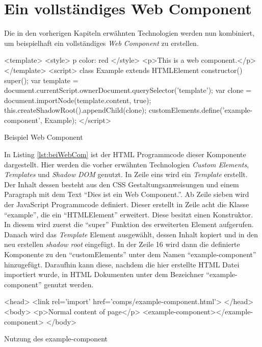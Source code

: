 \documentclass[12pt, paper=a4, bibtotoc, toc=listof, headsepline=true, numbers=endperiod]{scrreprt}
\begin{document}
		\section{Ein vollständiges Web Component}
		Die in den vorherigen Kapiteln erwähnten Technologien werden nun kombiniert, um beispielhaft ein vollständiges \emph{Web Component} zu erstellen. 		\begin{listing}
			\begin{HTMLcode*}{}
<template>
   <style>
      p {color: red}
   </style>
   <p>This is a web component.</p>
</template>
<script>
   class Example extends HTMLElement {
      constructor() {
         super();
         var template = document.currentScript.ownerDocument.querySelector('template');
         var clone = document.importNode(template.content, true);
         this.createShadowRoot().appendChild(clone);
      }
   }
customElements.define('example-component', Example);
</script>
			\end{HTMLcode*}
			\caption{Beispiel Web Component}
			\label{lst:beiWebCom}
		\end{listing}
		In Listing \ref{lst:beiWebCom} ist der \ac{HTML} Programmcode dieser Komponente dargestellt. Hier werden die vorher erwähnten Technologien \emph{Custom Elements}, \emph{Templates} und \emph{Shadow DOM} genutzt. In Zeile eins wird ein \emph{Template} erstellt. Der Inhalt dessen besteht aus den \ac{CSS} Gestaltungsanweisungen und einem Paragraph mit dem Text \enquote{Dies ist ein Web Component.}. Ab Zeile sieben wird der JavaScript Programmcode definiert. Dieser erstellt in Zeile acht die Klasse \enquote{example}, die ein \enquote{HTMLElement} erweitert. Diese besitzt einen Konstruktor. In diesem wird zuerst die \enquote{super} Funktion des erweiterten Element aufgerufen. Danach wird das \emph{Template} Element ausgewählt, dessen Inhalt kopiert und in den neu erstellen \emph{shadow root} eingefügt. In der Zeile 16 wird dann die definierte Komponente zu den \enquote{customElements} unter dem Namen \enquote{example-component} hinzugefügt. Daraufhin kann diese, nachdem die hier erstellte \ac{HTML} Datei importiert wurde, in \ac{HTML} Dokumenten unter dem Bezeichner \enquote{example-component} genutzt werden.
\begin{listing}[H]
	\begin{HTMLcode*}{}
<head>
   <link rel='import' href='comps/example-component.html'>
</head>
<body>
   <p>Normal content of page</p>
   <example-component></example-component>
</body>
	\end{HTMLcode*}
	\caption{Nutzung des example-component}
	\label{lst:nutExaCom}
\end{listing}
\end{document}
